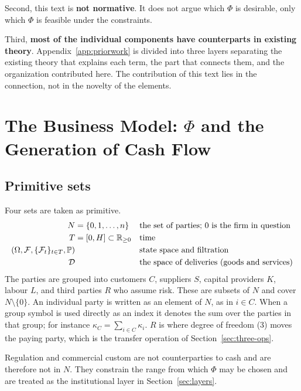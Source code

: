 Second, this text is \textbf{not normative}. It does not argue which $\Phi$ is desirable,
only which $\Phi$ is feasible under the constraints.

Third, \textbf{most of the individual components have counterparts in existing theory}.
Appendix~\ref{app:priorwork} is divided into three layers separating the existing theory
that explains each term, the part that connects them, and the organization contributed here.
The contribution of this text lies in the connection, not in the novelty of the elements.

\chapter{The Business Model: \texorpdfstring{$\Phi$}{Phi} and the Generation of Cash Flow}
\label{sec:phi}

\section{Primitive sets}

\begin{definition}
Four sets are taken as primitive.
\begin{align}
N &= \{0,1,\dots,n\} && \text{the set of parties; } 0 \text{ is the firm in question} \\
T &= [0,H] \subset \mathbb{R}_{\geq 0} && \text{time} \\
(\Omega,\mathcal{F},\{\mathcal{F}_t\}_{t\in T},\mathbb{P}) && &\text{state space and filtration} \\
\mathcal{D} && &\text{the space of deliveries (goods and services)}
\end{align}
The parties are grouped into customers $C$, suppliers $S$, capital providers $K$,
labour $L$, and third parties $R$ who assume risk. These are subsets of $N$ and cover
$N\setminus\{0\}$. An individual party is written as an element of $N$, as in $i\in C$.
When a group symbol is used directly as an index it denotes the sum over the parties in
that group; for instance $\kappa_C=\sum_{i\in C}\kappa_i$.
$R$ is where degree of freedom (3) moves the paying party, which is the transfer operation
of Section~\ref{sec:three-ops}.

Regulation and commercial custom are not counterparties to cash and are therefore not in
$N$. They constrain the range from which $\Phi$ may be chosen and are treated as the
institutional layer in Section~\ref{sec:layers}.
\end{definition}


